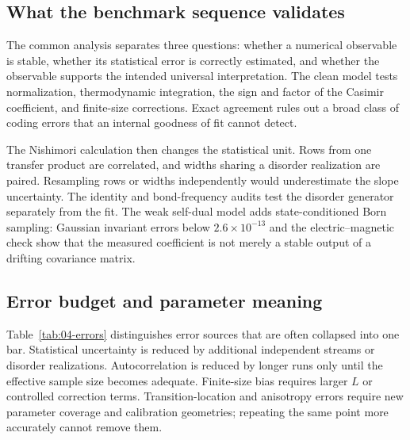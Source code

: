 \documentclass[aps,prb,reprint,superscriptaddress,longbibliography,floatfix]{revtex4-2}
\begin{document}
\subsection{What the benchmark sequence validates}

The common analysis separates three questions: whether a numerical observable
is stable, whether its statistical error is correctly estimated, and whether
the observable supports the intended universal interpretation.  The clean
model tests normalization, thermodynamic integration, the sign and factor of
the Casimir coefficient, and finite-size corrections.  Exact agreement rules
out a broad class of coding errors that an internal goodness of fit cannot
detect.

The Nishimori calculation then changes the statistical unit.  Rows from one
transfer product are correlated, and widths sharing a disorder realization
are paired.  Resampling rows or widths independently would underestimate the
slope uncertainty.  The identity and bond-frequency audits test the disorder
generator separately from the fit.  The weak self-dual model adds
state-conditioned Born sampling: Gaussian invariant errors below
$2.6\times10^{-13}$ and the electric--magnetic check show that the measured
coefficient is not merely a stable output of a drifting covariance matrix.

\subsection{Error budget and parameter meaning}

Table~\ref{tab:04-errors} distinguishes error sources that are often collapsed
into one bar.  Statistical uncertainty is reduced by additional independent
streams or disorder realizations.  Autocorrelation is reduced by longer runs
only until the effective sample size becomes adequate.  Finite-size bias
requires larger $L$ or controlled correction terms.  Transition-location and
anisotropy errors require new parameter coverage and calibration geometries;
repeating the same point more accurately cannot remove them.
\end{document}
